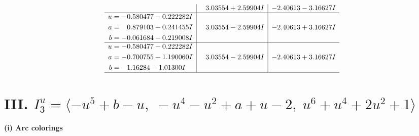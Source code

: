 \documentclass[1p]{elsarticle_modified}
\theoremstyle{definition}
\begin{document}
$$\begin{array}{c|c|c}
 & \phantom{-}3.03554 + 2.59904 I & -2.40613 - 3.16627 I \\ \hline\begin{aligned}
u &= -0.580477 - 0.222282 I \\
a &= \phantom{-}0.879103 - 0.241455 I \\
b &= -0.061684 - 0.219008 I\end{aligned}
 & \phantom{-}3.03554 - 2.59904 I & -2.40613 + 3.16627 I \\ \hline\begin{aligned}
u &= -0.580477 - 0.222282 I \\
a &= -0.700755 - 1.190060 I \\
b &= \phantom{-}1.16284 - 1.01300 I\end{aligned}
 & \phantom{-}3.03554 - 2.59904 I & -2.40613 + 3.16627 I\\
 \hline 
 \end{array}$$\newpage\newpage\renewcommand{\arraystretch}{1}
\centering \section*{III. $I^u_{3}= \langle - u^5+b- u,\;- u^4- u^2+a+u-2,\;u^6+u^4+2 u^2+1 \rangle$}
\flushleft \textbf{(i) Arc colorings}\\
\end{document}
